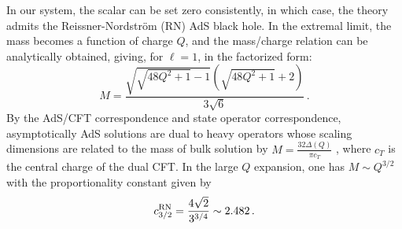 \documentclass[11pt]{article}
\newcommand{\be}{\begin{equation}}
\newcommand{\ee}{\end{equation}}
\begin{document}
In our system, the scalar can be set zero consistently, in which case, the theory admits the Reissner-Nordstr\"om (RN) AdS black hole. In the extremal limit, the mass becomes a function of charge $Q$, and the mass/charge relation can be analytically obtained, giving, for $\ell=1$, in the factorized form:
\be
M = \frac{\sqrt{\sqrt{48 Q^2+1}-1} \left(\sqrt{48 Q^2+1}+2\right)}{3 \sqrt{6}}\,.\label{rn-ads}
\ee
 By the AdS/CFT correspondence and state operator correspondence, asymptotically AdS solutions are dual to heavy operators whose scaling dimensions are related to the mass of bulk solution by $M=\frac{32 \Delta(Q)}{\pi c_T}$ \cite{Loukas:2018zjh,Liu:2020uaz}, where $c_T$ is the central charge of the dual CFT. In the large $Q$ expansion, one has $M\sim Q^{3/2}$ with the proportionality constant given by
\be
c_{3/2}^{\rm RN}=\frac{4 \sqrt{2}}{3^{3/4}}\sim 2.482\,.
\ee
\end{document}
